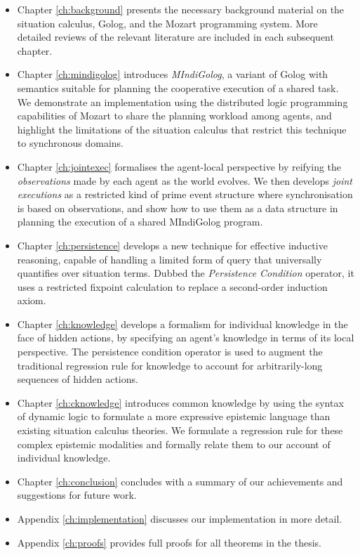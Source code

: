 \begin{itemize}
\item Chapter \ref{ch:background} presents the necessary background material
on the situation calculus, Golog, and the Mozart programming system.
More detailed reviews of the relevant literature are included in each
subsequent chapter.
\item Chapter \ref{ch:mindigolog} introduces \emph{MIndiGolog}, a variant
of Golog with semantics suitable for planning the cooperative execution
of a shared task\emph{.} We demonstrate an implementation using the
distributed logic programming capabilities of Mozart to share the
planning workload among agents, and highlight the limitations of the
situation calculus that restrict this technique to synchronous domains. 
\item Chapter \ref{ch:jointexec} formalises the agent-local perspective
by reifying the \emph{observations} made by each agent as the world
evolves. We then develops \emph{joint executions} as a restricted
kind of prime event structure where synchronisation is based on observations,
and show how to use them as a data structure in planning the execution
of a shared MIndiGolog program. 
\item Chapter \ref{ch:persistence} develops a new technique for effective
inductive reasoning, capable of handling a limited form of query that
universally quantifies over situation terms. Dubbed the \emph{Persistence
Condition} operator, it uses a restricted fixpoint calculation to
replace a second-order induction axiom. 
\item Chapter \ref{ch:knowledge} develops a formalism for individual knowledge
in the face of hidden actions, by specifying an agent's knowledge
in terms of its local perspective. The persistence condition operator
is used to augment the traditional regression rule for knowledge to
account for arbitrarily-long sequences of hidden actions. 
\item Chapter \ref{ch:cknowledge} introduces common knowledge by using
the syntax of dynamic logic to formulate a more expressive epistemic
language than existing situation calculus theories. We formulate a
regression rule for these complex epistemic modalities and formally
relate them to our account of individual knowledge. 
\item Chapter \ref{ch:conclusion} concludes with a summary of our achievements
and suggestions for future work. 
\item Appendix \ref{ch:implementation} discusses our implementation in
more detail. 
\item Appendix \ref{ch:proofs} provides full proofs for all theorems
in the thesis. 
\end{itemize}

